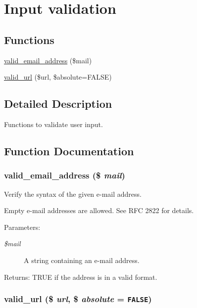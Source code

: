 \hypertarget{group__validation}{
\section{Input validation}
\label{group__validation}
}
\subsection*{Functions}
\begin{CompactItemize}
\item 
\hyperlink{group__validation_g486c51f034746a76618602e1e76fa718}{valid\_\-email\_\-address} (\$mail)
\item 
\hyperlink{group__validation_ge9221d1759a8d5a2ba2db93ae3a6feff}{valid\_\-url} (\$url, \$absolute=FALSE)
\end{CompactItemize}


\subsection{Detailed Description}
Functions to validate user input. 

\subsection{Function Documentation}
\hypertarget{group__validation_g486c51f034746a76618602e1e76fa718}{
\subsubsection[{valid\_\-email\_\-address}]{\setlength{\rightskip}{0pt plus 5cm}valid\_\-email\_\-address (\$ {\em mail})}}
\label{group__validation_g486c51f034746a76618602e1e76fa718}


Verify the syntax of the given e-mail address.

Empty e-mail addresses are allowed. See RFC 2822 for details.

\begin{Desc}
\item[Parameters:]
\begin{description}
\item[{\em \$mail}]A string containing an e-mail address. \end{description}
\end{Desc}
\begin{Desc}
\item[Returns:]TRUE if the address is in a valid format. \end{Desc}
\hypertarget{group__validation_ge9221d1759a8d5a2ba2db93ae3a6feff}{
\subsubsection[{valid\_\-url}]{\setlength{\rightskip}{0pt plus 5cm}valid\_\-url (\$ {\em url}, \/  \$ {\em absolute} = {\tt FALSE})}}
\label{group__validation_ge9221d1759a8d5a2ba2db93ae3a6feff}


